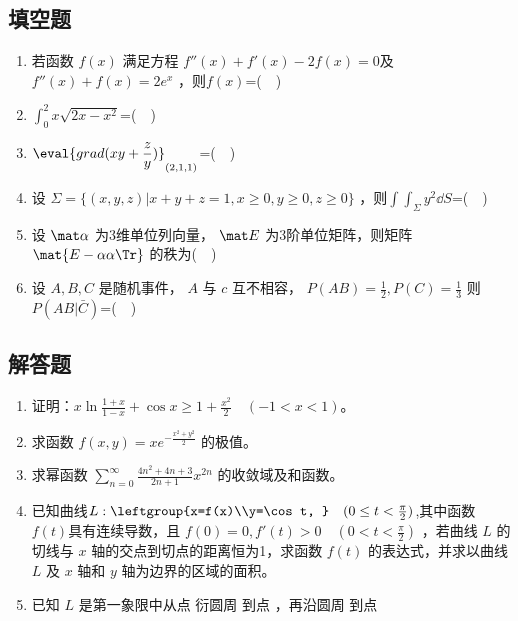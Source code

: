 \subsection{填空题}
\begin{enumerate}
\item 若函数 $f(x)$  满足方程 $f''(x)+f'(x)-2f(x)=0$及$f''(x)+f(x)=2e^x$ ，则$f(x)$=($\quad$)
\item $\displaystyle \int_{0}^{2} x\sqrt{2x-x^2}$=($\quad$)
\item $\displaystyle \eval{ grad(xy+\frac{z}{y})}_{(2,1,1)}$=($\quad$)
\item  设 $\Sigma=\{(x,y,z)|x+y+z=1,x\ge 0,y \ge 0,z \ge 0\}$  ，则$\displaystyle \int \int_\Sigma y^2\dd{S}$=($\quad$)
\item 设 $\mat \alpha$ 为3维单位列向量， $\mat E$ 为3阶单位矩阵，则矩阵 $\mat {E-\alpha\alpha \Tr}$ 的秩为($\quad$)
\item 设 $A,B,C$ 是随机事件， $A$ 与 $c$ 互不相容， $P(AB)=\frac{1}{2},P(C)=\frac{1}{3}$  则 $P(AB|\bar C)$=($\quad$)
\end{enumerate}
\subsection{解答题}
\begin{enumerate}
\item 证明：$\displaystyle x\ln \frac{1+x}{1-x}+\cos x\ge 1+\frac{x^2}{2} \quad (-1<x<1)$。
\item  求函数 $\displaystyle f(x,y)=xe^{-\frac{x^2+y^2}{2}}$  的极值。
\item  求幂函数 $\displaystyle \sum_{n=0}^\infty \frac{4n^2+4n+3}{2n+1}x^{2n}$ 的收敛域及和函数。
\item 已知曲线$L:\leftgroup{x=f(x)\\y=\cos t, }\quad (0 \le t<\frac{\pi}{2} )$,其中函数 $f(t)$具有连续导数，且 $f(0)=0,f'(t)>0 \quad (0<t<\frac{\pi}{2})$  ，若曲线 $L$ 的切线与 $x$ 轴的交点到切点的距离恒为1，求函数 $f(t)$ 的表达式，并求以曲线 $L$  及 $x$ 轴和 $y$ 轴为边界的区域的面积。
\item  已知 $L$ 是第一象限中从点  衍圆周  到点  ，再沿圆周  到点
\end{enumerate}

